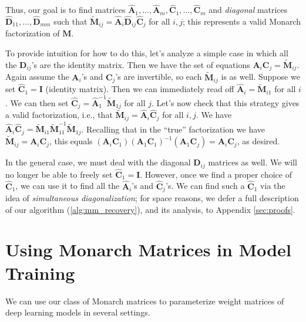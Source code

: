 Thus, our goal is to find matrices $\hat{\mathbf{A}}_1,\dots,\hat{\mathbf{A}}_m, \hat{\mathbf{C}}_1,\dots,\hat{\mathbf{C}}_m$ and \emph{diagonal} matrices $\hat{\mathbf{D}}_{11},\dots,\hat{\mathbf{D}}_{mm}$ such that $\widetilde{\mathbf{M}}_{ij} = \hat{\mathbf{A}}_i \hat{\mathbf{D}}_{ij} \hat{\mathbf{C}}_j$ for all $i,j$; this represents a valid Monarch factorization of $\mathbf{M}$.

To provide intuition for how to do this, let's analyze a simple case in which all the $\mathbf{D}_{ij}$'s are the identity matrix. Then we have the set of equations $\mathbf{A}_i \mathbf{C}_j = \widetilde{\mathbf{M}}_{ij}$. Again assume the $\mathbf{A}_i$'s and $\mathbf{C}_j$'s are invertible, so each $\widetilde{\mathbf{M}}_{ij}$ is as well. Suppose we set $\hat{\mathbf{C}}_1 = \mathbf{I}$ (identity matrix). Then we can immediately read off $\hat{\mathbf{A}}_i = \widetilde{\mathbf{M}}_{i1}$ for all $i$. We can then set $\hat{\mathbf{C}}_j = \hat{\mathbf{A}}_1^{-1}\widetilde{\mathbf{M}}_{1j}$ for all $j$. Let's now check that this strategy gives a valid factorization, i.e., that $\widetilde{\mathbf{M}}_{ij} = \hat{\mathbf{A}}_i \hat{\mathbf{C}}_j$ for all $i,j$. We have $\hat{\mathbf{A}}_i \hat{\mathbf{C}}_j = \widetilde{\mathbf{M}}_{i1} \widetilde{\mathbf{M}}_{11}^{-1} \widetilde{\mathbf{M}}_{1j}$. Recalling that in the ``true'' factorization we have $\widetilde{\mathbf{M}}_{ij} = \mathbf{A}_i \mathbf{C}_j$, this equals $(\mathbf{A}_i \mathbf{C}_1) (\mathbf{A}_1 \mathbf{C}_1)^{-1} (\mathbf{A}_1 \mathbf{C}_j) = \mathbf{A}_i \mathbf{C}_j$, as desired.

In the general case, we must deal with the diagonal $\mathbf{D}_{ij}$ matrices as well. We will no longer be able to freely set $\hat{\mathbf{C}}_1 = \mathbf{I}$. However, once we find a proper choice of $\hat{\mathbf{C}}_1$, we can use it to find all the $\hat{\mathbf{A}}_i$'s and $\hat{\mathbf{C}}_j$'s. We can find such a $\hat{\mathbf{C}}_1$ via the idea of \emph{simultaneous diagonalization}; for space reasons, we defer a full description of our algorithm (\ref{alg:mm_recovery}), and its analysis, to Appendix \ref{sec:proofs}.

\section{Using Monarch Matrices in Model Training}
\label{sec:method}

We can use our class of Monarch matrices to parameterize weight matrices of deep learning models in several settings.


